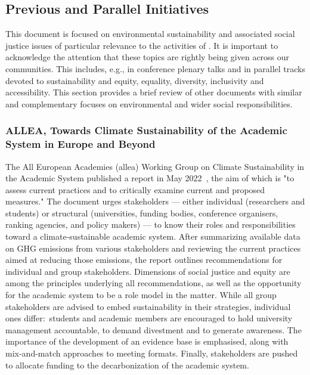 \documentclass[../SustainableHEP.tex]{subfiles}
\begin{document}

\newpage

\subsection{Previous and Parallel Initiatives}
\label{sec:other_initiatives}

This document is focused on environmental sustainability and associated social justice issues of particular relevance to the activities of \ACR. It is important to acknowledge the attention that these topics are rightly being given across our communities. This includes, e.g., in conference plenary talks and in parallel tracks devoted to sustainability and equity, equality, diversity, inclusivity and accessibility. This section provides a brief review of other documents with similar and complementary focuses on environmental and wider social responsibilities.


\subsubsection{ALLEA, Towards Climate Sustainability of the Academic System in Europe and Beyond}

The All European Academies (\acrshort{allea}) Working Group on Climate Sustainability in the Academic System published a report in May 2022~\cite{ALLEA}, the aim of which is "to  assess current practices and to critically examine current and proposed measures." 
The document urges stakeholders --- either individual (researchers and students) or structural (universities, funding bodies, conference organisers, ranking agencies, and
policy makers) --- to know their roles and responsibilities toward a climate-sustainable academic system.
After summarizing available data on GHG emissions from various stakeholders and reviewing
the current practices aimed at reducing those
emissions, the report outlines recommendations for individual and group stakeholders. 
Dimensions of social justice and equity are among the principles underlying all recommendations, as well as the opportunity for the academic system to be a role model in the matter. 
While all group stakeholders are advised to embed sustainability in their strategies, individual ones differ:\ students and academic members are encouraged to hold university management accountable, to demand divestment and to generate awareness. 
The importance of the development of an evidence base is emphasised, along with mix-and-match approaches to meeting formats. 
Finally, stakeholders are pushed to allocate funding to the decarbonization of the academic system.
\end{document}
